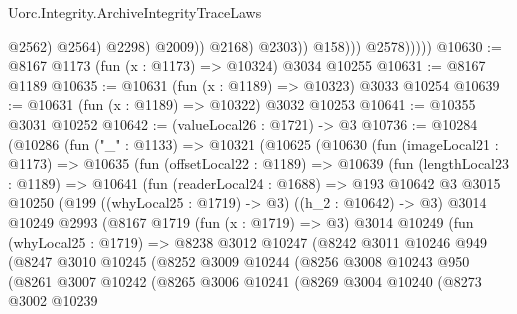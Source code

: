 \begin{lexlean}{Uorc.Integrity.ArchiveIntegrityTraceLaws}
\begin{coremodule}
                                    @2562)
                                  @2564)
                                @2298)
                              @2009))
                          @2168)
                        @2303))
                    @158)))
              @2578)))))
@10630 := @8167 @1173 (fun (x : @1173) => @10324) @3034 @10255
@10631 := @8167 @1189
@10635 := @10631 (fun (x : @1189) => @10323) @3033 @10254
@10639 := @10631 (fun (x : @1189) => @10322) @3032 @10253
@10641 := @10355 @3031 @10252
@10642 := (valueLocal26 : @1721) -> @3
@10736 := @10284
    (@10286
      (fun ("_" : @1133) =>
      @10321
        (@10625
          (@10630
            (fun (imageLocal21 : @1173) =>
            @10635
              (fun (offsetLocal22 : @1189) =>
              @10639
                (fun (lengthLocal23 : @1189) =>
                @10641
                  (fun (readerLocal24 : @1688) =>
                  @193
                    @10642
                    @3
                    @3015
                    @10250
                    (@199
                      ((whyLocal25 : @1719) -> @3)
                      ((h_2 : @10642) -> @3)
                      @3014
                      @10249
                      @2993
                      (@8167
                        @1719
                        (fun (x : @1719) => @3)
                        @3014
                        @10249
                        (fun (whyLocal25 : @1719) =>
                        @8238
                          @3012
                          @10247
                          (@8242
                            @3011
                            @10246
                            @949
                            (@8247
                              @3010
                              @10245
                              (@8252
                                @3009
                                @10244
                                (@8256
                                  @3008
                                  @10243
                                  @950
                                  (@8261
                                    @3007
                                    @10242
                                    (@8265
                                      @3006
                                      @10241
                                      (@8269
                                        @3004
                                        @10240
                                        (@8273
                                          @3002
                                          @10239

\end{coremodule}
\end{lexlean}
